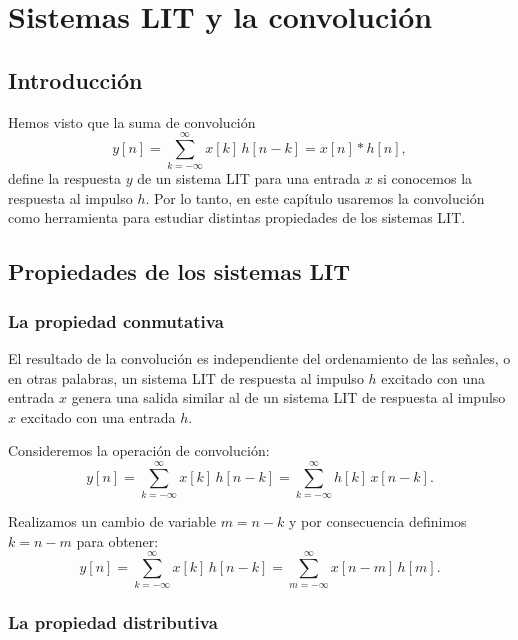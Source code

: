 \chapter{Sistemas LIT y la convolución}

\section{Introducción}

Hemos visto que la suma de convolución 
\begin{equation}
	y[n] = \sum_{k=-\infty}^{\infty} x[k] \, h[n-k] = x[n] * h[n] ,
\end{equation}
define la respuesta $y$ de un sistema LIT para una entrada $x$ si conocemos la respuesta al impulso $h$. Por lo tanto, en este capítulo usaremos la convolución como herramienta para estudiar distintas propiedades de los sistemas LIT.

\section{Propiedades de los sistemas LIT}

\subsection{La propiedad conmutativa}

El resultado de la convolución es independiente del ordenamiento de las señales, o en otras palabras, un sistema LIT de respuesta al impulso $h$ excitado con una entrada $x$ genera una salida similar al de un sistema LIT de respuesta al impulso $x$ excitado con una entrada $h$.

Consideremos la operación de convolución:
\begin{equation}
	y[n] = \sum_{k=-\infty}^{\infty} x[k] \, h[n-k] = \sum_{k=-\infty}^{\infty} h[k] \, x[n-k].
\end{equation}

Realizamos un cambio de variable $m = n - k$ y por consecuencia definimos $k = n - m$ para obtener:
\begin{equation}
	y[n] = \sum_{k=-\infty}^{\infty} x[k] \, h[n-k] = \sum_{m=-\infty}^{\infty} x[n-m] \, h[m].
\end{equation}

\subsection{La propiedad distributiva}


